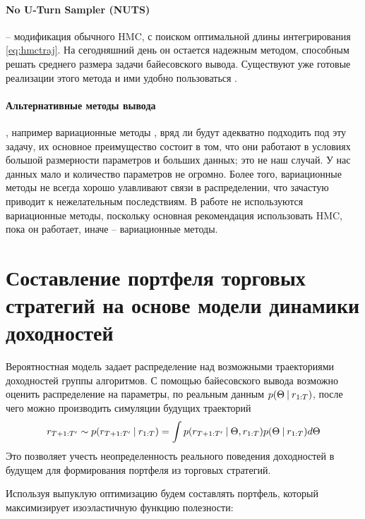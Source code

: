 \paragraph{No U-Turn Sampler (NUTS)} -- модификация обычного HMC, с поиском оптимальной длины интегрирования \eqref{eq:hmctraj}. На сегодняшний день он остается надежным методом, способным решать среднего размера задачи байесовского вывода. Существуют уже готовые реализации этого метода и ими удобно пользоваться \citep{salvatier2016pymc3}.

\paragraph{Альтернативные методы вывода}, например вариационные методы \citep{alp2015, jimenez2015, louizos2017}, вряд ли будут адекватно подходить под эту задачу, их основное преимущество состоит в том, что они работают в условиях большой размерности параметров и больших данных; это не наш случай. У нас данных мало и количество параметров не огромно. Более того, вариационные методы не всегда хорошо улавливают связи в распределении, что зачастую приводит к нежелательным последствиям. В работе не используются вариационные методы, поскольку основная рекомендация использовать HMC, пока он работает, иначе -- вариационные методы.
\section{Составление портфеля торговых стратегий на основе модели динамики доходностей}
Вероятностная модель задает распределение над возможными траекториями доходностей группы алгоритмов. С помощью байесовского вывода возможно оценить распределение на параметры, по реальным данным $p(\Theta\:|\: r_{1:T})$, после чего можно производить симуляции будущих траекторий 
\[r_{T+1:T'} \sim p(r_{T+1:T'}\:|\: r_{1:T}) = \int p(r_{T+1:T'}\:|\:\Theta, r_{1:T})p(\Theta\:|\: r_{1:T}) d\Theta\] 
Это позволяет учесть неопределенность реального поведения доходностей в будущем для формирования портфеля из торговых стратегий.

Используя выпуклую оптимизацию будем составлять портфель, который максимизирует изоэластичную функцию полезности:

